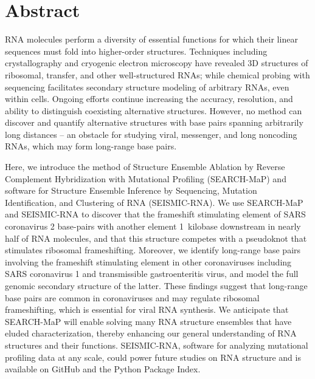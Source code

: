 \documentclass[main.tex]{subfiles}
\begin{document}
\section{Abstract}

RNA molecules perform a diversity of essential functions for which their linear sequences must fold into higher-order structures.
Techniques including crystallography and cryogenic electron microscopy have revealed 3D structures of ribosomal, transfer, and other well-structured RNAs; while chemical probing with sequencing facilitates secondary structure modeling of arbitrary RNAs, even within cells.
Ongoing efforts continue increasing the accuracy, resolution, and ability to distinguish coexisting alternative structures.
However, no method can discover and quantify alternative structures with base pairs spanning arbitrarily long distances -- an obstacle for studying viral, messenger, and long noncoding RNAs, which may form long-range base pairs.

Here, we introduce the method of Structure Ensemble Ablation by Reverse Complement Hybridization with Mutational Profiling (SEARCH-MaP) and software for Structure Ensemble Inference by Sequencing, Mutation Identification, and Clustering of RNA (SEISMIC-RNA).
We use SEARCH-MaP and SEISMIC-RNA to discover that the frameshift stimulating element of SARS coronavirus 2 base-pairs with another element 1~kilobase downstream in nearly half of RNA molecules, and that this structure competes with a pseudoknot that stimulates ribosomal frameshifting.
Moreover, we identify long-range base pairs involving the frameshift stimulating element in other coronaviruses including SARS coronavirus 1 and transmissible gastroenteritis virus, and model the full genomic secondary structure of the latter.
These findings suggest that long-range base pairs are common in coronaviruses and may regulate ribosomal frameshifting, which is essential for viral RNA synthesis.
We anticipate that SEARCH-MaP will enable solving many RNA structure ensembles that have eluded characterization, thereby enhancing our general understanding of RNA structures and their functions.
SEISMIC-RNA, software for analyzing mutational profiling data at any scale, could power future studies on RNA structure and is available on GitHub and the Python Package Index.
\end{document}
